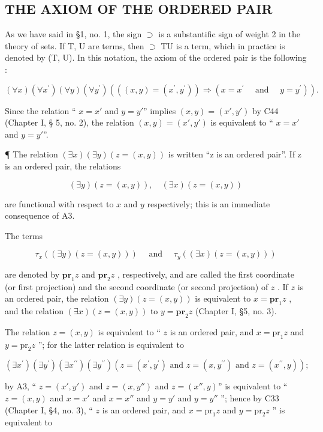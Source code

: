 \subsection{THE AXIOM OF THE ORDERED PAIR}

As we have said in §1, no. 1, the sign \(\supset\) is a substantific sign of weight 2 in the theory of sets. If T, U are terms, then \(\supset\) TU is a term, which in practice is denoted by (T, U). In this notation, the axiom of the ordered pair is the following :

\[
(\forall x) (\forall x ^ {\prime}) (\forall y) (\forall y ^ {\prime}) (((x, y) = (x ^ {\prime}, y ^ {\prime})) \Longrightarrow (x = x ^ {\prime} \quad \text { and } \quad y = y ^ {\prime})). \tag {A3.}
\]

Since the relation `` \(x = x'\) and \(y = y'\)'' implies \((x, y) = (x', y')\) by C44 (Chapter I, § 5, no. 2), the relation \((x, y) = (x', y')\) is equivalent to `` \(x = x'\) and \(y = y'\)''.

¶ The relation \((\exists x)(\exists y)(z=(x,y))\) is written ``z is an ordered pair''. If z is an ordered pair, the relations

\[
(\exists y) (z = (x, y)), \quad (\exists x) (z = (x, y))
\]

are functional with respect to \(x\) and \(y\) respectively; this is an immediate consequence of A3.

The terms

\[
\tau_ {x} ((\exists y) (z = (x, y))) \quad \text { and } \quad \tau_ {y} ((\exists x) (z = (x, y)))
\]

are denoted by \(\mathbf{pr}_1z\) and \(\mathbf{pr}_2z\) , respectively, and are called the first coordinate (or first projection) and the second coordinate (or second projection) of \(z\) . If \(z\) is an ordered pair, the relation \((\exists y)(z = (x, y))\) is equivalent to \(x = \mathbf{pr}_1z\) , and the relation \((\exists x)(z = (x, y))\) to \(y = \mathbf{pr}_2z\) (Chapter I, §5, no. 3).

The relation \(z = (x, y)\) is equivalent to `` \(z\) is an ordered pair, and \(x = \text{pr}_1z\) and \(y = \text{pr}_2z\) ''; for the latter relation is equivalent to

\[
(\exists x ^ {\prime}) (\exists y ^ {\prime}) (\exists x ^ {\prime \prime}) (\exists y ^ {\prime \prime}) (z = (x ^ {\prime}, y ^ {\prime}) \text {   and   } z = (x, y ^ {\prime \prime}) \text {   and   } z = (x ^ {\prime \prime}, y));
\]

by A3, `` \(z = (x', y')\) and \(z = (x, y'')\) and \(z = (x'', y)\)'' is equivalent to `` \(z = (x, y)\) and \(x = x'\) and \(x = x''\) and \(y = y'\) and \(y = y''\) ''; hence by C33 (Chapter I, §4, no. 3), `` \(z\) is an ordered pair, and \(x = \text{pr}_1 z\) and \(y = \text{pr}_2 z\) '' is equivalent to

